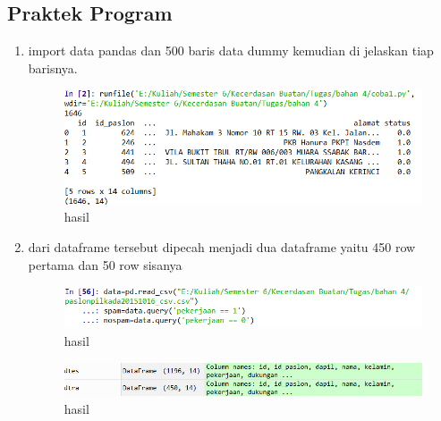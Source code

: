 \subsection{Praktek Program}
\begin{enumerate}
\item import data pandas dan 500 baris data dummy kemudian di jelaskan tiap barisnya.

\begin{figure}[H]
\centering
\includegraphics[scale=0.7]{figures/1174031/4/6.PNG}
\caption{hasil}
\label{Praktek no 1}
\end{figure}		

\item dari dataframe tersebut dipecah menjadi dua dataframe yaitu 450 row pertama dan 50 row sisanya

\begin{figure}[H]
\centering
\includegraphics[scale=0.7]{figures/1174031/4/7_1.PNG}
\caption{hasil}
\label{Praktek}
\end{figure}

\begin{figure}[H]
\centering
\includegraphics[scale=0.7]{figures/1174031/4/7.PNG}
\caption{hasil}
\label{Praktek no 2}
\end{figure}		


\end{enumerate}
